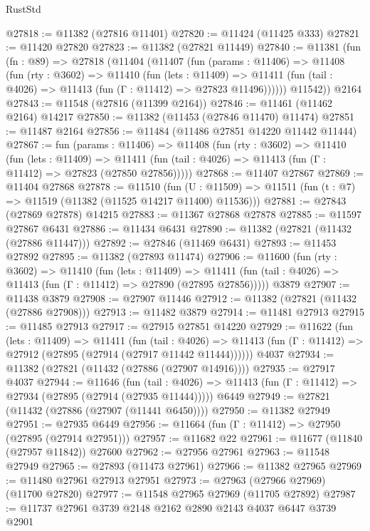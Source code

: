\begin{lexlean}{RustStd}
\begin{coremodule}
@27818 := @11382 (@27816 @11401)
@27820 := @11424 (@11425 @333)
@27821 := @11420 @27820
@27823 := @11382 (@27821 @11449)
@27840 := @11381
    (fun (fn : @89) =>
    @27818
      (@11404
        (@11407
          (fun (params : @11406) =>
          @11408
            (fun (rty : @3602) =>
            @11410
              (fun (lets : @11409) =>
              @11411 (fun (tail : @4026) => @11413 (fun (Γ : @11412) => @27823 @11496))))))
        @11542))
    @2164
@27843 := @11548 (@27816 (@11399 @2164))
@27846 := @11461 (@11462 @2164) @14217
@27850 := @11382 (@11453 (@27846 @11470) @11474)
@27851 := @11487 @2164
@27856 := @11484 (@11486 @27851 @14220 @11442 @11444)
@27867 := fun (params : @11406) =>
  @11408
    (fun (rty : @3602) =>
    @11410
      (fun (lets : @11409) =>
      @11411 (fun (tail : @4026) => @11413 (fun (Γ : @11412) => @27823 (@27850 @27856)))))
@27868 := @11407 @27867
@27869 := @11404 @27868
@27878 := @11510
    (fun (U : @11509) => @11511 (fun (t : @7) => @11519 (@11382 (@11525 @14217 @11400) @11536)))
@27881 := @27843 (@27869 @27878) @14215
@27883 := @11367 @27868 @27878
@27885 := @11597 @27867 @6431
@27886 := @11434 @6431
@27890 := @11382 (@27821 (@11432 (@27886 @11447)))
@27892 := @27846 (@11469 @6431)
@27893 := @11453 @27892
@27895 := @11382 (@27893 @11474)
@27906 := @11600
    (fun (rty : @3602) =>
    @11410
      (fun (lets : @11409) =>
      @11411 (fun (tail : @4026) => @11413 (fun (Γ : @11412) => @27890 (@27895 @27856)))))
    @3879
@27907 := @11438 @3879
@27908 := @27907 @11446
@27912 := @11382 (@27821 (@11432 (@27886 @27908)))
@27913 := @11482 @3879
@27914 := @11481 @27913
@27915 := @11485 @27913
@27917 := @27915 @27851 @14220
@27929 := @11622
    (fun (lets : @11409) =>
    @11411
      (fun (tail : @4026) =>
      @11413 (fun (Γ : @11412) => @27912 (@27895 (@27914 (@27917 @11442 @11444))))))
    @4037
@27934 := @11382 (@27821 (@11432 (@27886 (@27907 @14916))))
@27935 := @27917 @4037
@27944 := @11646
    (fun (tail : @4026) => @11413 (fun (Γ : @11412) => @27934 (@27895 (@27914 (@27935 @11444)))))
    @6449
@27949 := @27821 (@11432 (@27886 (@27907 (@11441 @6450))))
@27950 := @11382 @27949
@27951 := @27935 @6449
@27956 := @11664 (fun (Γ : @11412) => @27950 (@27895 (@27914 @27951)))
@27957 := @11682 @22
@27961 := @11677 (@11840 (@27957 @11842)) @27600
@27962 := @27956 @27961
@27963 := @11548 @27949
@27965 := @27893 (@11473 @27961)
@27966 := @11382 @27965
@27969 := @11480 @27961 @27913 @27951
@27973 := @27963 (@27966 @27969) (@11700 @27820)
@27977 := @11548 @27965 @27969 (@11705 @27892)
@27987 := @11737 @27961 @3739 @2148 @2162 @2890 @2143 @4037 @6447 @3739 @2901

\end{coremodule}
\end{lexlean}
